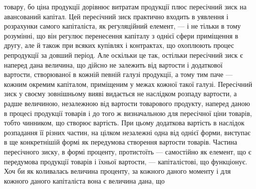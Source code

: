 товару, бо ціна продукції дорівнює витратам продукції плюс пересічний
зиск на авансований капітал. Цей пересічний зиск практично входить в
уявлення і розрахунки самого капіталіста, як регуляційний елемент, — і не
тільки в тому розумінні, що він регулює перенесення капіталу з однієї сфери
приміщення в другу, але й також при всяких купівлях і контрактах, що охоплюють
процес репродукції за довший період. Але оскільки це так, остільки пересічний
зиск є наперед дана величина, що дійсно не залежить від вартости і додаткової
вартости, створюваної в кожній певній галузі продукції, а тому тим паче —
кожним окремим капіталом, приміщеним у межах кожної такої галузі. Пересічний
зиск у своєму зовнішньому вияві видається не наслідком розпаду вартости,
а радше величиною, незалежною від вартости товарового продукту, наперед даною
в процесі продукції товарів і до того ж визначальною для пересічної ціни
товарів, тобто чинником, що створює вартість. При цьому додаткова вартість
в наслідок розпадання її різних частин, на цілком незалежні одна від однієї
форми, виступає в ще конкретнішій формі як передумова створення вартости
товарів. Частина пересічного зиску, в формі проценту, протистоїть — самостійно
як елемент, що є передумова продукції товарів і їхньої вартости, — капіталістові,
що функціонує. Хоч би як коливалась величина проценту, за кожного
даного моменту і для кожного даного капіталіста вона є величина дана, що
